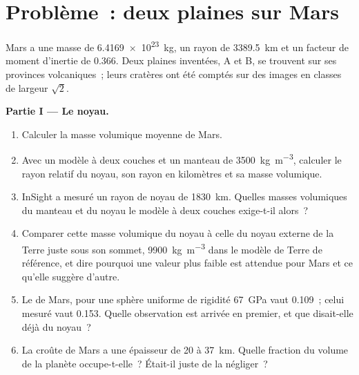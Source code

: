 \section{Problème~: deux plaines sur Mars}

\begin{problem}
\label{pb:b3:planetary-interiors-surfaces:1}
Mars a une masse de \qty{6.4169e23}{kg}, un rayon de \qty{3389.5}{km} et un
facteur de moment d'inertie de 0.366. Deux plaines inventées, A et B, se trouvent sur ses
provinces volcaniques~; leurs cratères ont été comptés sur des images en classes
de largeur $\sqrt2$.

\medskip\noindent\textbf{Partie I --- Le noyau.}
\begin{enumerate}
\item Calculer la masse volumique moyenne de Mars.
\item Avec un modèle à deux couches et un manteau de \qty{3500}{kg.m^{-3}}, calculer
  le rayon relatif du noyau, son rayon en kilomètres et sa
  masse volumique.
\item InSight a mesuré un rayon de noyau de \qty{1830}{km}. Quelles
  masses volumiques du manteau et du noyau le modèle à deux couches exige-t-il alors~?
\item Comparer cette masse volumique du noyau à celle du noyau externe de la Terre
  juste sous son sommet, \qty{9900}{kg.m^{-3}} dans le modèle de Terre de référence,
  et dire pourquoi une valeur plus faible est attendue pour Mars et ce qu'elle
  suggère d'autre.
\item Le  de Mars, pour une sphère uniforme de rigidité
  \qty{67}{GPa} vaut 0.109~; celui mesuré vaut 0.153. Quelle observation est
  arrivée en premier, et que disait-elle déjà du noyau~?
\item La croûte de Mars a une épaisseur de 20 à \qty{37}{km}. Quelle fraction du
  volume de la planète occupe-t-elle~? Était-il juste de la négliger~?
\end{enumerate}


\end{problem}
